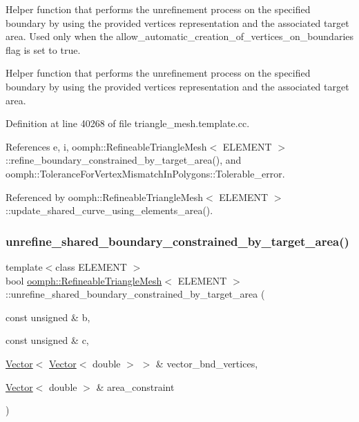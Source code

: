 Helper function that performs the unrefinement process on the specified boundary by using the provided vertices representation and the associated target area. Used only when the \textquotesingle{}allow\+\_\+automatic\+\_\+creation\+\_\+of\+\_\+vertices\+\_\+on\+\_\+boundaries\textquotesingle{} flag is set to true. 

Helper function that performs the unrefinement process on the specified boundary by using the provided vertices representation and the associated target area. 

Definition at line 40268 of file triangle\+\_\+mesh.\+template.\+cc.



References e, i, oomph\+::\+Refineable\+Triangle\+Mesh$<$ E\+L\+E\+M\+E\+N\+T $>$\+::refine\+\_\+boundary\+\_\+constrained\+\_\+by\+\_\+target\+\_\+area(), and oomph\+::\+Tolerance\+For\+Vertex\+Mismatch\+In\+Polygons\+::\+Tolerable\+\_\+error.



Referenced by oomph\+::\+Refineable\+Triangle\+Mesh$<$ E\+L\+E\+M\+E\+N\+T $>$\+::update\+\_\+shared\+\_\+curve\+\_\+using\+\_\+elements\+\_\+area().

\mbox{\label{classoomph_1_1RefineableTriangleMesh_a4631299a76f524bb6bed190836e26bcd}} 
\subsubsection{\texorpdfstring{unrefine\+\_\+shared\+\_\+boundary\+\_\+constrained\+\_\+by\+\_\+target\+\_\+area()}{unrefine\_shared\_boundary\_constrained\_by\_target\_area()}}
{\footnotesize\ttfamily template$<$class E\+L\+E\+M\+E\+NT $>$ \\
bool \hyperlink{classoomph_1_1RefineableTriangleMesh}{oomph\+::\+Refineable\+Triangle\+Mesh}$<$ E\+L\+E\+M\+E\+NT $>$\+::unrefine\+\_\+shared\+\_\+boundary\+\_\+constrained\+\_\+by\+\_\+target\+\_\+area (\begin{DoxyParamCaption}\item[{const unsigned \&}]{b,  }\item[{const unsigned \&}]{c,  }\item[{\hyperlink{classoomph_1_1Vector}{Vector}$<$ \hyperlink{classoomph_1_1Vector}{Vector}$<$ double $>$ $>$ \&}]{vector\+\_\+bnd\+\_\+vertices,  }\item[{\hyperlink{classoomph_1_1Vector}{Vector}$<$ double $>$ \&}]{area\+\_\+constraint }\end{DoxyParamCaption})\hspace{0.3cm}{\ttfamily [protected]}}



